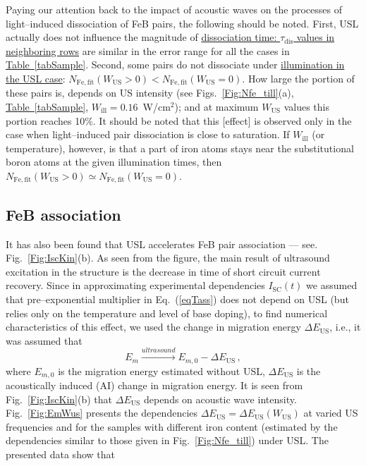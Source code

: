 \documentclass[%
 aip,jap,
 amsmath,amssymb,
 reprint,%
]{revtex4-1}
\begin{document}
Paying our attention back to the impact of acoustic waves on the processes of light--induced dissociation of FeB pairs, the following should be noted.
First,  USL actually does not influence the magnitude of
\textcolor[rgb]{0.00,0.07,1.00}{\uline{
dissociation time:
$\tau_\mathrm{dis}$ values in neighboring rows}}
are similar in the error range for all the cases in
\textcolor[rgb]{0.00,0.07,1.00}{\uline{
Table~\ref{tabSample}}}.
Second, some pairs do not dissociate under \textcolor[rgb]{0.00,0.07,1.00}{\uline{illumination in the USL case}}:
$N_\mathrm{Fe,fit}(W_\mathrm{US}>0)< N_\mathrm{Fe,fit}(W_\mathrm{US}=0)$.
How large the portion of these pairs is, depends on US intensity
(see Figs.~\ref{Fig:Nfe_till}(a),
\textcolor[rgb]{0.00,0.07,1.00}{\uline{
Table~\ref{tabSample}}},
$W_\mathrm{ill}=0.16$~W/cm$^2$);
and at maximum $W_\mathrm{US}$ values this portion reaches 10\%.
It should be noted that this [effect] is observed only in the case when light--induced pair dissociation is close to saturation.
If $W_\mathrm{ill}$ (or temperature), however, is that a part of iron atoms stays near the substitutional boron atoms at the given illumination times,
then $N_\mathrm{Fe,fit}(W_\mathrm{US}>0)\simeq N_\mathrm{Fe,fit}(W_\mathrm{US}=0)$.


\subsection{\label{sec:FeBass}FeB association}

It has also been found that USL accelerates FeB pair association --–
see. Fig.~\ref{Fig:IscKin}(b).
As seen from the figure, the main result of ultrasound excitation in the structure
is the decrease in time of short circuit current recovery.
Since in approximating experimental dependencies $I_\mathrm{SC}(t)$ we assumed that pre--exponential multiplier in Eq.~(\ref{eqTass}) does not depend on USL
(but relies only on the temperature and level of base doping),
to find numerical characteristics of this effect,
we used the change in migration energy $\Delta E_\mathrm{US}$, i.e., it was assumed that
\begin{equation}
\label{eqEmUs}
E_m \xrightarrow{ultrasound} E_{m,0}-\Delta E_\mathrm{US}\,,
\end{equation}
where $E_{m,0}$ is the migration energy estimated without USL,
$\Delta E_\mathrm{US}$ is the acoustically induced (AI) change in migration energy.
It is seen from Fig.~\ref{Fig:IscKin}(b)
that $\Delta E_\mathrm{US}$ depends on acoustic wave intensity.
Fig.~\ref{Fig:EmWus} presents the dependencies $\Delta E_\mathrm{US}=\Delta E_\mathrm{US}(W_\mathrm{US})$ at varied US frequencies and for the samples with different iron content
(estimated by the dependencies similar to those given in Fig.~\ref{Fig:Nfe_till}) under USL.
The presented data show that
\end{document}
